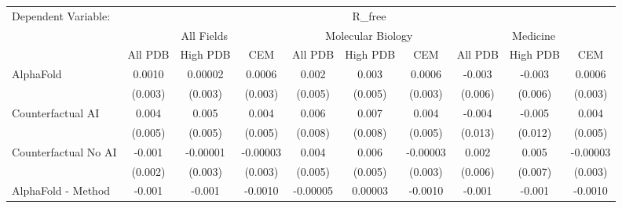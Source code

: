 \begingroup
\centering
\begin{tabular}{lccccccccc}
   \tabularnewline \midrule \midrule
   Dependent Variable: & \multicolumn{9}{c}{R\_free}\\
 & \multicolumn{3}{c}{All Fields} & \multicolumn{3}{c}{Molecular Biology} & \multicolumn{3}{c}{Medicine} \\
\cmidrule(lr){2-7} \cmidrule(lr){5-10} \cmidrule(lr){8-7}
 & \multicolumn{1}{c}{All PDB} & \multicolumn{1}{c}{High PDB} & \multicolumn{1}{c}{CEM} & \multicolumn{1}{c}{All PDB} & \multicolumn{1}{c}{High PDB} & \multicolumn{1}{c}{CEM} & \multicolumn{1}{c}{All PDB} & \multicolumn{1}{c}{High PDB} & \multicolumn{1}{c}{CEM} \\
\cmidrule(lr){2-3} \cmidrule(lr){3-4} \cmidrule(lr){4-5} \cmidrule(lr){5-6} \cmidrule(lr){6-7} \cmidrule(lr){7-8} \cmidrule(lr){8-9} \cmidrule(lr){9-10} \cmidrule(lr){10-3}
   AlphaFold                                                   & 0.0010         & 0.00002        & 0.0006        & 0.002          & 0.003          & 0.0006        & -0.003       & -0.003      & 0.0006\\   
                                                               & (0.003)        & (0.003)        & (0.003)       & (0.005)        & (0.005)        & (0.003)       & (0.006)      & (0.006)     & (0.003)\\   
   Counterfactual AI                                           & 0.004          & 0.005          & 0.004         & 0.006          & 0.007          & 0.004         & -0.004       & -0.005      & 0.004\\   
                                                               & (0.005)        & (0.005)        & (0.005)       & (0.008)        & (0.008)        & (0.005)       & (0.013)      & (0.012)     & (0.005)\\   
   Counterfactual No AI                                        & -0.001         & -0.00001       & -0.00003      & 0.004          & 0.006          & -0.00003      & 0.002        & 0.005       & -0.00003\\   
                                                               & (0.002)        & (0.003)        & (0.003)       & (0.005)        & (0.005)        & (0.003)       & (0.006)      & (0.007)     & (0.003)\\   
   AlphaFold - Method                                          & -0.001         & -0.001         & -0.0010       & -0.00005       & 0.00003        & -0.0010       & -0.001       & -0.001      & -0.0010\\   

\end{tabular}
